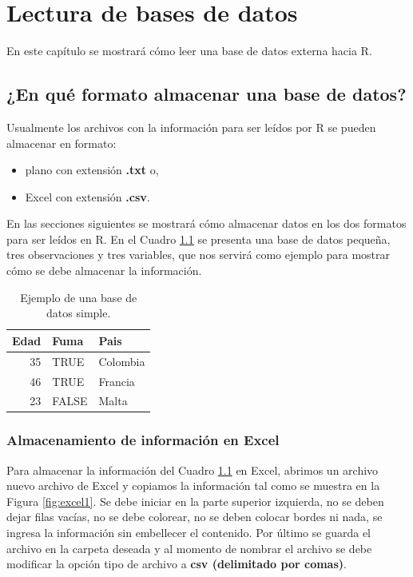 \documentclass[10pt,]{krantz}
\providecommand{\tightlist}{%
  \setlength{\itemsep}{0pt}\setlength{\parskip}{0pt}}
\begin{document}
\chapter{Lectura de bases de datos}\label{read}

En este capítulo se mostrará cómo leer una base de datos externa hacia
R.

\section{\texorpdfstring{¿En qué formato almacenar una base de datos?
}{¿En qué formato almacenar una base de datos?  }}\label{en-que-formato-almacenar-una-base-de-datos}

Usualmente los archivos con la información para ser leídos por R se
pueden almacenar en formato:

\begin{itemize}
\tightlist
\item
  plano con extensión \textbf{.txt} o,
\item
  Excel con extensión \textbf{.csv}.
\end{itemize}

En las secciones siguientes se mostrará cómo almacenar datos en los dos
formatos para ser leídos en R. En el Cuadro \ref{tab:dt1} se presenta
una base de datos pequeña, tres observaciones y tres variables, que nos
servirá como ejemplo para mostrar cómo se debe almacenar la información.

\begin{table}

\caption{\label{tab:dt1}Ejemplo de una base de datos simple.}
\centering
\begin{tabular}[t]{rll}
\toprule
Edad & Fuma & Pais\\
\midrule
35 & TRUE & Colombia\\
46 & TRUE & Francia\\
23 & FALSE & Malta\\
\bottomrule
\end{tabular}
\end{table}

\subsection{\texorpdfstring{Almacenamiento de información en Excel
}{Almacenamiento de información en Excel }}\label{almacenamiento-de-informacion-en-excel}

Para almacenar la información del Cuadro \ref{tab:dt1} en Excel, abrimos
un archivo nuevo archivo de Excel y copiamos la información tal como se
muestra en la Figura \ref{fig:excel1}. Se debe iniciar en la parte
superior izquierda, no se deben dejar filas vacías, no se debe colorear,
no se deben colocar bordes ni nada, se ingresa la información sin
embellecer el contenido. Por último se guarda el archivo en la carpeta
deseada y al momento de nombrar el archivo se debe modificar la opción
tipo de archivo a \textbf{csv (delimitado por comas)}.
\end{document}
